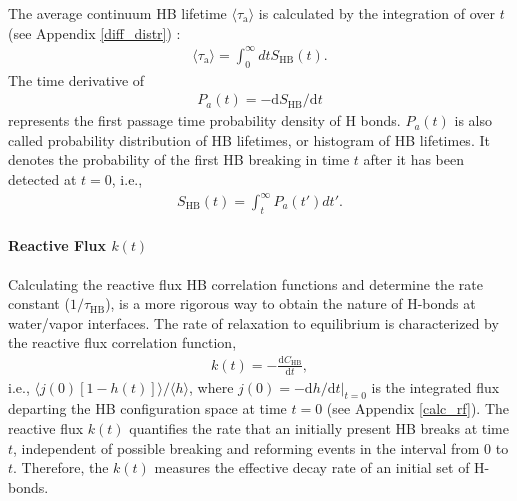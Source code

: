 The average continuum HB lifetime $\langle \tau_{\mathrm{a}} \rangle$ is calculated by the integration of \SHB over $t$ (see Appendix \ref{diff_distr}) :  
\begin{eqnarray}
  \langle\tau_{\mathrm{a}}\rangle = \int_0^\infty dt S_{\text{HB}}(t).
\label{eq:calculate_hb_lifetime_from_s}
\end{eqnarray}
%
The time derivative of \SHB
\begin{eqnarray}
P_a(t) = -\text{d}S_{\text{HB}}/\text{d}t
\label{eq:P_1}
\end{eqnarray}
represents the first passage time probability density of H bonds. $P_a(t)$ is also called probability distribution of HB lifetimes, \cite{Sciortino1990prl,Krausche1992,FWS99,Voloshin2009} or histogram of HB lifetimes.\cite{Geiger1984,Stanley2000}
It denotes the probability of the first HB breaking in time $t$ after it has been detected at $t=0$, i.e.,
\begin{eqnarray}
S_{\text{HB}}(t)= \int_t^\infty P_a(t')dt'.
\label{eq:P_2}
\end{eqnarray}
%

\FloatBarrier
\paragraph{Reactive Flux $k(t)$} 
Calculating the reactive flux HB correlation functions and determine the rate constant ($1/\tau_{\text{HB}}$),
is a more rigorous way to obtain the nature of H-bonds at water/vapor interfaces. \cite{AL00}
The rate of relaxation to equilibrium is characterized by the reactive flux correlation function, 
\begin{eqnarray}
k(t) = -\frac{\text{d}C_{\text{HB}}}{\text{d}t},
\label{eq:k}
\end{eqnarray}
i.e., $\langle j(0)[1-h(t)]\rangle/\langle h\rangle$,
where 
$j(0)=-\text{d}h/\text{d}t|_{t=0}$ 
is the integrated flux departing the HB configuration space at time $t=0$ (see Appendix \ref{calc_rf}).
The reactive flux $k(t)$ quantifies the rate that an initially present HB breaks at time $t$, 
independent of possible breaking and reforming events in the interval from 0 to $t$.
Therefore, the $k(t)$ measures the effective decay rate of an 
initial set of H-bonds. \cite{DC87,FWS00}

